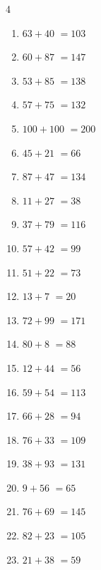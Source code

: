 \begin{multicols}{4}
\begin{enumerate}
  \item $63+40$
        $=103$

  \item $60+87$
        $=147$

  \item $53+85$
        $=138$

  \item $57+75$
        $=132$

  \item $100+100$
        $=200$

\columnbreak %

  \item $45+21$
        $=66$

  \item $87+47$
        $=134$

  \item $11+27$
        $=38$

  \item $37+79$
        $=116$

  \item $57+42$
        $=99$

  \item $51+22$
        $=73$

  \item $13+7$
        $=20$

  \item $72+99$
        $=171$

  \item $80+8$
        $=88$

  \item $12+44$
        $=56$

  \item $59+54$
        $=113$

  \item $66+28$
        $=94$

  \item $76+33$
        $=109$

  \item $38+93$
        $=131$

  \item $9+56$
        $=65$

  \item $76+69$
        $=145$

  \item $82+23$
        $=105$

  \item $21+38$
        $=59$


\end{enumerate}
\end{multicols}
